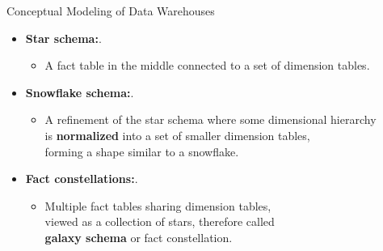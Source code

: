 \begin{frame}{Conceptual Modeling of Data Warehouses}
  \begin{itemize}
  \item \textbf{Star schema:}.
    \begin{itemize}
    \item A fact table in the middle connected to a set of dimension tables.
    \end{itemize}
  \item \textbf{Snowflake schema:}.
    \begin{itemize}
    \item A refinement of the star schema where some dimensional hierarchy \\
      is \textbf{normalized} into a set of smaller dimension tables,\\
      forming a shape similar to a snowflake.
    \end{itemize}
  \item \textbf{Fact constellations:}.
    \begin{itemize}
    \item Multiple fact tables sharing dimension tables, \\
      viewed as a collection of stars, therefore called \\
      \textbf{galaxy schema} or fact constellation.
    \end{itemize}
  \end{itemize}
\end{frame}

